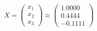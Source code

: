 \documentclass[preview]{standalone}
\begin{document}
\begin{align*}
X = \begin{pmatrix} x_1 \\ x_2 \\ x_3 \end{pmatrix} \approx \begin{pmatrix} 1.0000 \\ 0.4444 \\ -0.1111 \end{pmatrix}
\end{align*}
\end{document}
